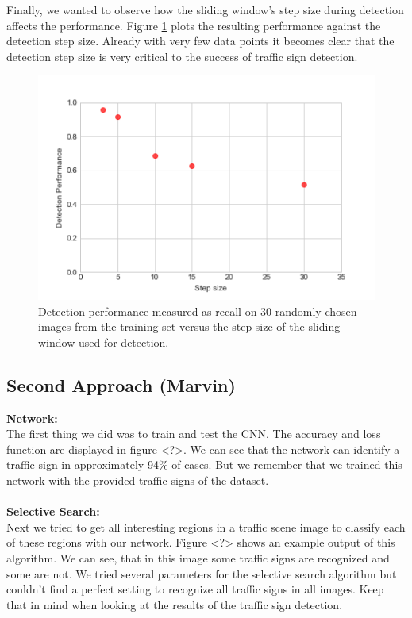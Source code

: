 \documentclass[12pt,a4paper,bibliography=totocnumbered,listof=totocnumbered]{scrartcl}
\begin{document}
Finally, we wanted to observe how the sliding window's step size during detection affects the performance. Figure \ref{fig:step_perf} plots the resulting performance against the detection step size. Already with very few data points it becomes clear that the detection step size is very critical to the success of traffic sign detection. 

\begin{figure}[H]
\centering
  \includegraphics[width=0.5\linewidth]{step_performance_jaccthres0-5}
  \caption{Detection performance measured as recall on 30 randomly chosen images from the training set versus the step size of the sliding window used for detection.}
  \label{fig:step_perf}
\end{figure}

\pagebreak
\subsection{Second Approach \small{(Marvin)}}

\textbf{Network:}\\
The first thing we did was to train and test the CNN. The accuracy and loss function are displayed in figure <?>. We can see that the network can identify a traffic sign in approximately 94\% of cases. But we remember that we trained this network with the provided traffic signs of the dataset.\\\\

\textbf{Selective Search:}\\
Next we tried to get all interesting regions in a traffic scene image to classify each of these regions with our network. Figure <?> shows an example output of this algorithm. We can see, that in this image some traffic signs are recognized and some are not. We tried several parameters for the selective search algorithm but couldn't find a perfect setting to recognize all traffic signs in all images. Keep that in mind when looking at the results of the traffic sign detection.
\end{document}

